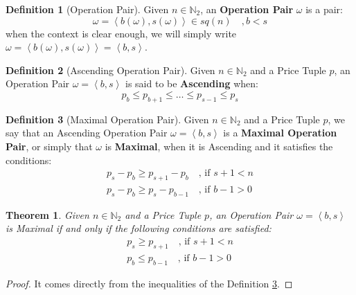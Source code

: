 \documentclass{article}
\newcommand{\N}{\mathbb{N}}
\newcommand{\Nb}[1]{\ensuremath{\N_{#1}}}
\newcommand{\Nt}{\Nb{2}}
\newcommand{\Square}[1]{\ensuremath{sq({#1})}}
\newcommand{\tuple}[1]{\ensuremath{\left\langle #1 \right\rangle}}
\newcommand{\dref}[1]{Definition \ref{#1}\xspace}
\newcommand{\op}{\ensuremath{\omega}}
\renewcommand{\b}[1]{\ensuremath{b\left( #1 \right)}}
\newcommand{\s}[1]{\ensuremath{s\left( #1 \right)}}
\theoremstyle{definition}
\newtheorem{defn}{Definition}
\theoremstyle{plain}
\newtheorem{theorem}{Theorem}
\begin{document}
\begin{defn}[Operation Pair]
    \label{def:op-pair}
    Given $n \in \Nt$, an \textbf{Operation Pair} $\op$ is a pair:
    \begin{equation}
        \op = \tuple{\b{\op}, \s{\op}} \in \Square{n}
        \quad ,
        b < s
    \end{equation}
    when the context is clear enough, we will simply write $\op = \tuple{\b{\op}, \s{\op}} = \tuple{b, s}$.
\end{defn}

\begin{defn}[Ascending Operation Pair]
    Given $n \in \Nt$ and a Price Tuple $p$, an Operation Pair $\op = \tuple{b, s}$ is said to be \textbf{Ascending} when:
    \begin{equation}
        p_{b} \leqslant p_{b+1} \leqslant \dots \leqslant p_{s-1} \leqslant p_{s}
    \end{equation}
\end{defn}

\begin{defn}[Maximal Operation Pair]
    \label{def:max-op-pair}
    Given $n \in \Nt$ and a Price Tuple $p$, we say that an Ascending Operation Pair $\op = \tuple{b, s}$ is a \textbf{Maximal Operation Pair}, or simply that $\op$ is \textbf{Maximal}, when it is Ascending and it satisfies the conditions:
    \begin{align}
        p_s - p_b \geqslant p_{s+1} - p_b \quad \mbox{, if } s+1 < n\\
        p_s - p_b \geqslant p_s - p_{b-1} \quad \mbox{, if } b-1 > 0
    \end{align}
\end{defn}

\begin{theorem}
    \label{theorem:max-op-pair}
    Given $n \in \Nt$ and a Price Tuple $p$, an Operation Pair $\op = \tuple{b, s}$ is Maximal if and only if the following conditions are satisfied:
    \begin{align}
        p_s \geqslant p_{s+1} \quad \mbox{, if } s+1 < n\\
        p_b \leqslant p_{b-1} \quad \mbox{, if } b-1 > 0
    \end{align}
\end{theorem}

\begin{proof}
    It comes directly from the inequalities of the \dref{def:max-op-pair}.
\end{proof}
\end{document}
